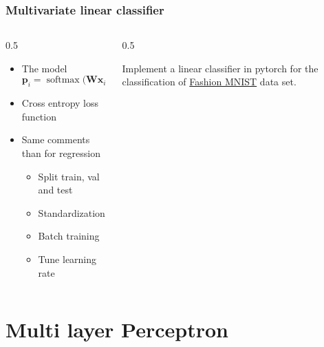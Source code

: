\documentclass[pressentation,10pt,aspectratio=169,xcolor=table, colorlinks=true]{beamer}
\DeclareMathOperator{\softmax}{softmax}
\begin{document}
\begin{frame}
  \frametitle{Multivariate linear classifier}
  \begin{columns}
    \begin{column}{0.5\linewidth}
      \begin{itemize}
      \item The model
        \[\mathbf{p}_i = \softmax\Big(\mathbf{W}\mathbf{x}_i + \mathbf{b}\Big)\]
      \item Cross entropy loss function
      \item Same comments than for regression
        \begin{itemize}
        \item Split train, val and test
        \item Standardization
        \item Batch training
        \item Tune learning rate
        \end{itemize}
      \end{itemize}
    \end{column}
    \begin{column}{0.5\linewidth}
      \begin{work}
        Implement a linear classifier in pytorch for the classification of \href{https://github.com/zalandoresearch/fashion-mnist}{Fashion MNIST} data set.
      \end{work}
    \end{column}
  \end{columns}
\end{frame}


\section{Multi layer Perceptron}
\end{document}

